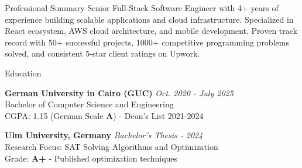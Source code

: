 \documentclass{resume}
\begin{document}

\begin{rSection}{Professional Summary}
Senior Full-Stack Software Engineer with 4+ years of experience building scalable applications and cloud infrastructure. Specialized in React ecosystem, AWS cloud architecture, and mobile development. Proven track record with 50+ successful projects, 1000+ competitive programming problems solved, and consistent 5-star client ratings on Upwork.
\end{rSection}


\begin{rSection}{Education}

{\bf German University in Cairo (GUC)} \hfill {\em Oct. 2020 - July 2025} \\
Bachelor of Computer Science and Engineering \\
CGPA: 1.15 (German Scale {\bf A}) - Dean's List 2021-2024

{\bf Ulm University, Germany} \hfill {\em Bachelor's Thesis - 2024} \\
Research Focus: SAT Solving Algorithms and Optimization \\
Grade: {\bf A+} - Published optimization techniques

\end{rSection}

\end{document}
